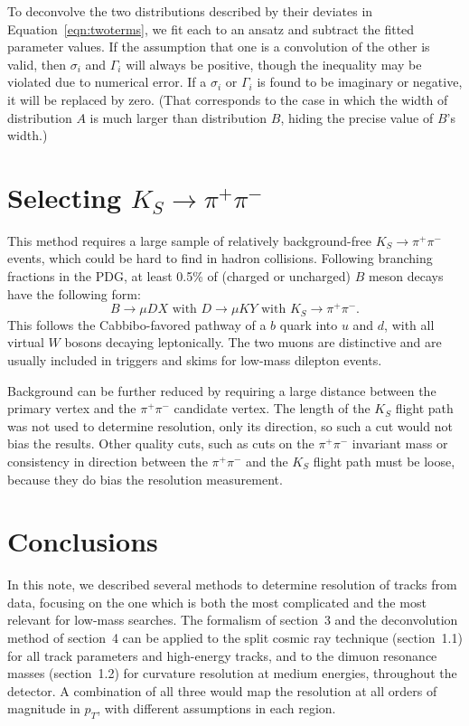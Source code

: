 \documentclass[12pt]{article}
\begin{document}
To deconvolve the two distributions described by their deviates in
Equation~\ref{eqn:twoterms}, we fit each to an ansatz and subtract
the fitted parameter values.  If the assumption that one is a
convolution of the other is valid, then $\sigma_i$ and $\Gamma_i$ will
always be positive, though the inequality may be violated due to
numerical error.  If a $\sigma_i$ or $\Gamma_i$ is found to be
imaginary or negative, it will be replaced by zero.  (That corresponds
to the case in which the width of distribution $A$ is much larger than
distribution $B$, hiding the precise value of $B$'s width.)

\section{Selecting $K_S \to \pi^+\pi^-$}

This method requires a large sample of relatively background-free $K_S
\to \pi^+\pi^-$ events, which could be hard to find in hadron
collisions.  Following branching fractions in the PDG, at least 0.5\%
of (charged or uncharged) $B$ meson decays have the following form:
\begin{equation}
B \to \mu D X \mbox{ with } D \to \mu K Y \mbox{ with } K_S \to \pi^+\pi^- \mbox{.}
\end{equation}
This follows the Cabbibo-favored pathway of a $b$ quark into $u$ and
$d$, with all virtual $W$ bosons decaying leptonically.  The two muons
are distinctive and are usually included in triggers and skims for
low-mass dilepton events.

Background can be further reduced by requiring a large distance
between the primary vertex and the $\pi^+\pi^-$ candidate vertex.  The
length of the $K_S$ flight path was not used to determine resolution,
only its direction, so such a cut would not bias the results.  Other
quality cuts, such as cuts on the $\pi^+\pi^-$ invariant mass or
consistency in direction between the $\pi^+\pi^-$ and the $K_S$ flight
path must be loose, because they do bias the resolution measurement.

\section{Conclusions}

In this note, we described several methods to determine resolution of
tracks from data, focusing on the one which is both the most
complicated and the most relevant for low-mass searches.  The
formalism of section~3 and the deconvolution method of section~4 can
be applied to the split cosmic ray technique (section~1.1) for all
track parameters and high-energy tracks, and to the dimuon resonance
masses (section~1.2) for curvature resolution at medium energies,
throughout the detector.  A combination of all three would map the
resolution at all orders of magnitude in $p_T$, with different
assumptions in each region.
\end{document}
